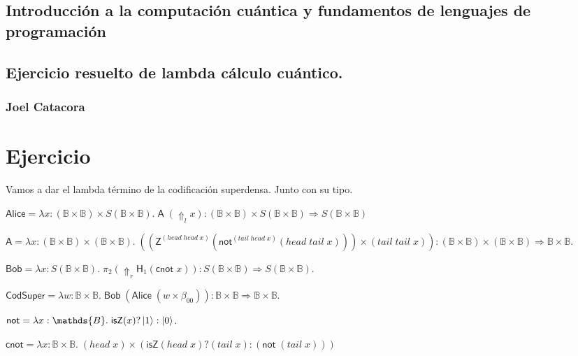 \documentclass[a4paper,11pt]{article}
\title{}
\author{}
\begin{document}
\maketitle 

\thispagestyle{empty}
\begin{center}
\section*{Introducción a  la computación cuántica y fundamentos de lenguajes de programación} 
\subsection*{Ejercicio resuelto de lambda cálculo cuántico.}
\subsubsection*{Joel Catacora}

\end{center}

\newpage{\pagestyle{empty}\cleardoublepage}

\newpage

\section*
{Ejercicio}

Vamos a dar el lambda término de la codificación superdensa. Junto con su tipo.

$ \textsf{Alice} = \lambda x : (\mathds{B} \times \mathds{B}) \times S (\mathds{B} \times \mathds{B}). \; \textsf{A} \; (\Uparrow_{l} x)
 : (\mathds{B} \times  \mathds{B}) \times S(\mathds{B} \times \mathds{B}) \Rightarrow S(\mathds{B} \times \mathds{B})$


$ \textsf{A} = \lambda x: (\mathds{B} \times \mathds{B}) \times (\mathds{B} \times \mathds{B}). \; ((\textsf{Z}^{(head \; head \; x)} 
  (\textsf{not}^{(tail \; head \; x)} (head \; tail \; x))) \times (tail \; tail \; x)) 
  : (\mathds{B} \times  \mathds{B}) \times (\mathds{B} \times  \mathds{B}) 
  \Rightarrow \mathds{B} \times \mathds{B}.$

$ \textsf{Bob} = \lambda x : S(\mathds{B} \times \mathds{B}). \; \pi_{2} (\Uparrow_{r} \textsf{H}_{1} (\textsf{cnot} \; x)) 
  : S(\mathds{B} \times \mathds{B}) \Rightarrow S(\mathds{B} \times \mathds{B}).$

$ \textsf{CodSuper} = \lambda w : \mathds{B} \times \mathds{B}. \; \textsf{Bob} \; (\textsf{Alice} \; (w \times \beta_{00}) ) 
  : \mathds{B} \times \mathds{B} \Rightarrow \mathds{B} \times \mathds{B}.$

$ \textsf{not} = \lambda x: \mathds{B}. \; \textsf{isZ}(x) ? \ket{1} : \ket{0}$.

$ \textsf{cnot} = \lambda x: \mathds{B} \times \mathds{B}. \; ( head \; x) \times (\textsf{isZ}( head \; x) ?
  (tail \; x) : (\textsf{not} \; (tail \; x)) )$
\end{document}
